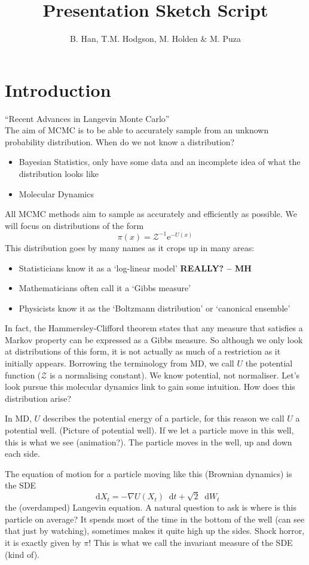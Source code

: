 \documentclass[a4paper]{article}
\title{Presentation Sketch Script}
\author{B. Han, T.M. Hodgson, M. Holden \& M. Puza}
\newcommand{\dif}{\mathop{}\!\mathrm{d}}
\newcommand{\e}{\mathrm{e}}
\newcommand{\grad}{\nabla}
\begin{document}
\maketitle
\section{Introduction}
``Recent Advances in Langevin Monte Carlo'' \\
The aim of MCMC is to be able to accurately sample from an unknown probability distribution. When do we not know a distribution?
 \begin{itemize}
     \item Bayesian Statistics, only have some data and an incomplete idea of what the distribution looks like
     \item Molecular Dynamics
 \end{itemize}
 All MCMC methods aim to sample as accurately and efficiently as possible. We will focus on distributions of the form 
 \[\pi(x) = \mathcal{Z}^{-1} \e^{-U(x)}\]
 This distribution goes by many names as it crops up in many areas:
 \begin{itemize}
     \item Statisticians know it as a `log-linear model' \textbf{REALLY? -- MH}
     \item Mathematicians often call it a `Gibbs measure'
     \item Physicists know it as the `Boltzmann distribution' or `canonical ensemble'
 \end{itemize}
 In fact, the Hammersley-Clifford theorem states that any measure that satisfies a Markov property can be expressed as a Gibbs measure. So although we only look at distributions of this form, it is not actually as much of a restriction as it initially appears. Borrowing the terminology from MD, we call \(U\) the potential function (\(\mathcal{Z}\) is a normalising constant). We know potential, not normaliser. Let's look pursue this molecular dynamics link to gain some intuition. How does this distribution arise?
 
 In MD, \(U\) describes the potential energy of a particle, for this reason we call \(U\) a potential well. (Picture of potential well). If we let a particle move in this well, this is what we see (animation?). The particle moves in the well, up and down each side. 
 
 The equation of motion for a particle moving like this (Brownian dynamics) is the SDE
 \[\dif X_t = -\grad U(X_t) \dif t +\sqrt{2}\dif W_t\]
 the (overdamped) Langevin equation. A natural question to ask is where is this particle on average? It spends most of the time in the bottom of the well (can see that just by watching), sometimes makes it quite high up the sides. Shock horror, it is exactly given by \(\pi\)! This is what we call the invariant measure of the SDE (kind of).
\end{document}

